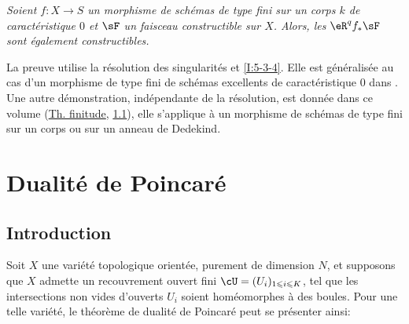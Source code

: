 \begingroup
\renewcommand*{\thesubsubsection}{3.5.2}
\begin{sourceinline}\label{I:5-3-7} %
\itshape
Soient $f:X\to S$ un morphisme de schémas de type fini sur un corps $k$ de 
caractéristique $0$ et $\sF$ un faisceau constructible sur $X$. Alors, les 
$\eR^q f_* \sF$ sont également constructibles.
\end{sourceinline}
\endgroup

La preuve utilise la résolution des singularités et \ref{I:5-3-4}. Elle est 
généralisée au cas d'un morphisme de type fini de schémas excellents de 
caractéristique $0$ dans . Une autre démonstration, 
indépendante de la résolution, est donnée dans ce volume 
(\hyperref[VII]{Th. finitude}, \hyperref[VII:1-1]{1.1}),
elle s'applique à un morphisme de schémas de type fini sur un corps ou sur 
un anneau de Dedekind. 




















\section{Dualité de Poincaré}\label{I:6}










\subsection{Introduction}\label{I:6-1}

Soit $X$ une variété topologique orientée, purement de dimension $N$, et 
supposons que $X$ admette un recouvrement ouvert fini 
$\cU=(U_i)_{1\leqslant i\leqslant K}$, tel que les intersections non vides 
d'ouverts $U_i$ soient homéomorphes à des boules. Pour une telle variété, 
le théorème de dualité de Poincaré peut se présenter ainsi: 

